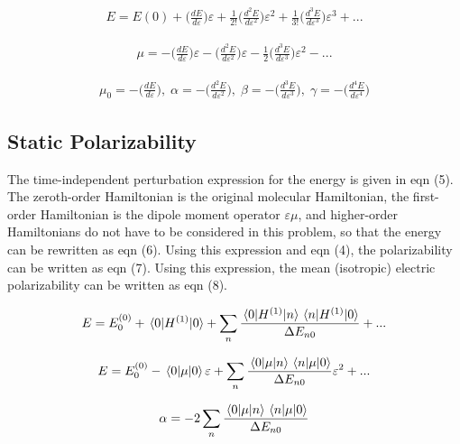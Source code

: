 \begin{align}
 E =E(0) +    \bigg( \frac{dE}{d \varepsilon } \bigg) \varepsilon  + \frac{1}{2!}   \bigg( \frac{ d^{2} E}{d  \varepsilon^{2}  }\bigg) \varepsilon^{2}+\frac{1}{3!}   \bigg( \frac{ d^{3} E}{d  \varepsilon^{3}  }\bigg) \varepsilon^{3}+...
\end{align}

\begin{align}
 \mu  =-\bigg( \frac{dE}{d \varepsilon } \bigg) \varepsilon  - \bigg( \frac{ d^{2} E}{d  \varepsilon^{2}  }\bigg) \varepsilon-\frac{1}{2}   \bigg( \frac{ d^{3} E}{d  \varepsilon^{3}  }\bigg) \varepsilon^{2}- ...
\end{align}

\begin{align}
 \mu_0  =-\bigg( \frac{dE}{d \varepsilon } \bigg) , \; \alpha =- \bigg( \frac{ d^{2} E}{d  \varepsilon^{2}  }\bigg), \; \beta= -  \bigg( \frac{ d^{3} E}{d  \varepsilon^{3}  }\bigg), \; \gamma = - \bigg( \frac{ d^{4} E}{d  \varepsilon^{4}  }\bigg) 
\end{align}


\subsection{Static Polarizability}

The time-independent perturbation expression for the energy is given in eqn (5). The zeroth-order Hamiltonian is the original molecular Hamiltonian, the first-order Hamiltonian is the dipole moment operator $\varepsilon$$\mu$, and higher-order Hamiltonians do not have to be considered in this problem, so that the energy can be rewritten as eqn (6). Using this expression and eqn (4), the polarizability can be written as eqn (7). Using this expression, the mean (isotropic) electric polarizability can be written as eqn (8).
   
\begin{align}
 E =E_0^{(0)} + \expval{H^{(1) }}{0} +
 \sum_n  \frac{\mel{0}{H^{(1)}}{n}\mel{n}{H^{(1)}}{0}}{ \Delta E_{n0} }+ ...
\end{align}

\begin{align}
E =E_0^{(0)} - \expval{\mu}{0}\varepsilon +
\sum_n  \frac{\mel{0}{\mu}{n}\mel{n}{\mu}{0}}{ \Delta E_{n0} } \varepsilon^2+ ...
\end{align}

\begin{align}
\alpha =-2\sum_n  \frac{\mel{0}{\mu}{n}\mel{n}{\mu}{0}}{ \Delta E_{n0} }
\end{align}

